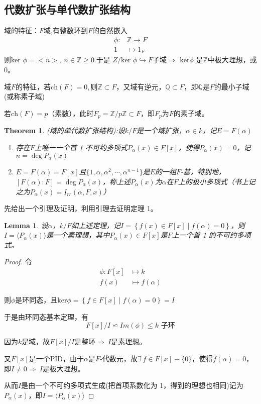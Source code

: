 \documentclass[UTF8]{article}
\newtheorem{thm}{Theorem}[section]
\newtheorem{lem}{Lemma}[section]
\begin{document}
\subsection{代数扩张与单代数扩张结构}

域的特征：$F$域,有整数环到$F$的自然嵌入
\[
\begin{split}
\phi:&\mathbb{Z} \rightarrow F\\
1 &\mapsto 1_{F}
\end{split}
\]
则ker $\phi=<n>,\ n\in\mathbb{Z}\geqslant 0$.于是
$Z/\text{ker }\phi\hookrightarrow F$子域$\Rightarrow\text{ ker}\phi$ 是$\mathbb{Z}$中极大理想，或0。

域$F$的特征，若$\text{ch}(F)=0,$则$ \mathbb{Z}\subset F$，又域有逆元，$\mathbb{Q}\subset F$，即$\mathbb{Q}$是$F$的最小子域(或称素子域)

若$\text{ch}(F)=p$（素数），此时$F_p=\mathbb{Z}/p\mathbb{Z}\subset F$，即$F_p$为$F$的素子域。

\begin{thm}
(域的单代数扩张结构):设$k/F$是一个域扩张，$\alpha\in k$，记$E=F(\alpha)$
\begin{enumerate}
	\item[(1)] 存在$F$上唯一一个首 1 不可约多项式$P_{\alpha}(x)\in F[x]$，使得$P_{\alpha}(x)=0$，记$n=\operatorname{deg}P_{\alpha}(x)$
	\item[(2)] $E=F(\alpha)=F[x]$且$\{ 1,\alpha,\alpha^2,\cdots,\alpha^{n-1}\}$是$E$的一组$F$-基，特别地，$[F(\alpha): F]=\operatorname{deg}P_{\alpha}(x)$，称上述$P_{\alpha}(x)$为$\alpha$在$F$上的极小多项式（书上记之为$P_{\alpha}(x)=I_{rr}\left( \alpha, F, x\right)$）
\end{enumerate}
\end{thm}
先给出一个引理及证明，利用引理去证明定理 1。
\begin{lem}
设$\alpha$，$k/F$如上述定理，记$I=\left\{ f(x)\in F[x] \mid f(\alpha)=0\right\}$，则$I=\langle P_{\alpha}(x)\rangle$是一个素理想，其中$P_{\alpha}(x)\in F[x]$是$F$上一个首 1 的不可约多项式。
\end{lem}
\begin{proof}令
\[\begin{split}
\phi:F[x]&\longmapsto k\\
f(x)&\longmapsto f(\alpha)
\end{split}
\]

\quad 则$\phi$是环同态，且$\text{ker}\phi=\left\{ f\in F[x] \mid f(\alpha)=0\right\}=I$

\quad 于是由环同态基本定理，有
$$
F[x]/I\backsimeq Im(\phi)\leqslant k\text{ 子环}
$$

\quad 因为$k$是域，故$F[x]/I$是整环$\Rightarrow\ I$是素理想。

\quad 又$F[x]$是一个PID，由于$\alpha$是$F$-代数元，故$\exists\ f\in F[x] - \{ 0\}$，使得$f(\alpha)=0$，即$I\neq 0\Rightarrow\ I$是极大理想。

\quad 从而$I$是由一个不可约多项式生成(把首项系数化为 1，得到的理想也相同)记为$P_{\alpha}(x)$，即$I=\langle P_{\alpha}(x)\rangle$
\end{proof}
\end{document}
